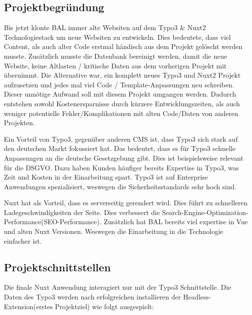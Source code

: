 \subsection{Projektbegründung} 
\label{sec:Projektbegruendung}
Bis jetzt klonte \acs{BAL} immer alte Websiten auf dem Typo3 \& Nuxt2 Technologiestack um neue Websiten zu entwickeln. Dies bedeutete, dass viel Content, als auch alter Code erstmal händisch aus dem Projekt gelöscht werden musste. Zusätzlich musste die Datenbank bereinigt werden, damit die neue Website, keine Altlasten / kritische Daten aus dem vorherigen Projekt mit übernimmt. Die Alternative war, ein komplett neues Typo3 und Nuxt2 Projekt aufzusetzen und jedes mal viel Code / Template-Anpassungen neu schreiben. Dieser unnötige Aufwand soll mit diesem Projekt umgangen werden. Dadurch entstehen sowohl Kostenersparnisse durch kürzere Entwicklungszeiten, als auch weniger potentielle Fehler/Komplikationen mit alten Code/Daten von anderen Projekten.

Ein Vorteil von Typo3, gegenüber anderen \acs{CMS} ist, dass Typo3 sich stark auf den deutschen Markt fokussiert hat. Das bedeutet, dass es für Typo3 schnelle Anpassungen an die deutsche Gesetzgebung gibt. Dies ist beispielsweise relevant für die \acs{DSGVO}. Dazu haben Kunden häufiger bereits Expertise in Typo3, was Zeit und Kosten in der Einarbeitung spart. Typo3 ist auf Enterprise Anwendungen spezialisiert, weswegen die Sicherheitsstandards sehr hoch sind.

Nuxt hat als Vorteil, dass es serverseitig gerendert wird. Dies führt zu schnelleren Ladegeschwindigkeiten der Seite. Dies verbessert die Search-Engine-Optimization-Performance(\acs{SEO}-Performance). Zusätzlich hat \acs{BAL} bereits viel expertise in Vue und alten Nuxt Versionen. Weswegen die Einarbeitung in die Technologie einfacher ist.

\subsection{Projektschnittstellen} 
\label{sec:Projektschnittstellen}

Die finale Nuxt Anwendung interagiert nur mit der Typo3 Schnittstelle. Die Daten des Typo3 werden nach erfolgreichen installieren der Headless-Extension(erstes Projektziel) wie folgt ausgespielt:

